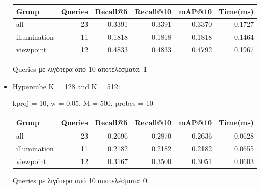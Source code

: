\documentclass [conference]{IEEEtran}
\begin{document}
\begin{itemize}

     \begin{table}[H]
    \centering
    \small
    \setlength{\tabcolsep}{3pt}
    \begin{tabular}{l r r r r r}
    \hline
    \textbf{Group} & \textbf{Queries} & \textbf{Recall@5} & \textbf{Recall@10} & \textbf{mAP@10} & \textbf{Time(ms)} \\
    \hline
    all & 23 & 0.3391 & 0.3391 & 0.3370 & 0.1727 \\
    illumination & 11 & 0.1818 & 0.1818 & 0.1818 & 0.1464 \\
    viewpoint & 12 & 0.4833 & 0.4833 & 0.4792 & 0.1967 \\
    \hline
    \end{tabular}
    \par\smallskip
    \footnotesize Queries με λιγότερα από 10 αποτελέσματα: 1
    \end{table}
     
      
    \item Hypercube K = 128 and K = 512:
    \begin{table}[H]
    \centering
    \small
    \setlength{\tabcolsep}{3pt}
    kproj = 10, w = 0.05, M = 500, probes = 10
    \par\smallskip
    \begin{tabular}{l r r r r r}
    \hline
    \textbf{Group} & \textbf{Queries} & \textbf{Recall@5} & \textbf{Recall@10} & \textbf{mAP@10} & \textbf{Time(ms)} \\
    \hline
    all & 23 & 0.2696 & 0.2870 & 0.2636 & 0.0628 \\
    illumination & 11 & 0.2182 & 0.2182 & 0.2182 & 0.0655 \\
    viewpoint & 12 & 0.3167 & 0.3500 & 0.3051 & 0.0603 \\
    \hline
    \end{tabular}
    \par\smallskip
    \footnotesize Queries με λιγότερα από 10 αποτελέσματα: 0
    \end{table}
    


\end{itemize}
\end{document}
